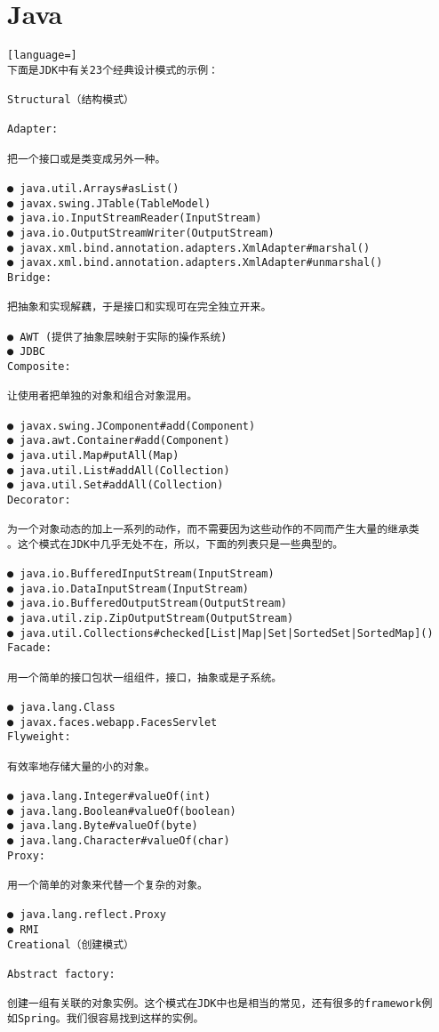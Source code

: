 \documentclass[a4paper,11pt]{book}
\begin{document}
\chapter{Java}

\begin{lstlisting}[language=]
下面是JDK中有关23个经典设计模式的示例：

Structural（结构模式）

Adapter:

把一个接口或是类变成另外一种。

● java.util.Arrays#asList()
● javax.swing.JTable(TableModel)
● java.io.InputStreamReader(InputStream)
● java.io.OutputStreamWriter(OutputStream)
● javax.xml.bind.annotation.adapters.XmlAdapter#marshal()
● javax.xml.bind.annotation.adapters.XmlAdapter#unmarshal()
Bridge:

把抽象和实现解藕，于是接口和实现可在完全独立开来。

● AWT (提供了抽象层映射于实际的操作系统)
● JDBC
Composite:

让使用者把单独的对象和组合对象混用。

● javax.swing.JComponent#add(Component)
● java.awt.Container#add(Component)
● java.util.Map#putAll(Map)
● java.util.List#addAll(Collection)
● java.util.Set#addAll(Collection)
Decorator:

为一个对象动态的加上一系列的动作，而不需要因为这些动作的不同而产生大量的继承类
。这个模式在JDK中几乎无处不在，所以，下面的列表只是一些典型的。

● java.io.BufferedInputStream(InputStream)
● java.io.DataInputStream(InputStream)
● java.io.BufferedOutputStream(OutputStream)
● java.util.zip.ZipOutputStream(OutputStream)
● java.util.Collections#checked[List|Map|Set|SortedSet|SortedMap]()
Facade:

用一个简单的接口包状一组组件，接口，抽象或是子系统。

● java.lang.Class
● javax.faces.webapp.FacesServlet
Flyweight:

有效率地存储大量的小的对象。

● java.lang.Integer#valueOf(int)
● java.lang.Boolean#valueOf(boolean)
● java.lang.Byte#valueOf(byte)
● java.lang.Character#valueOf(char)
Proxy:

用一个简单的对象来代替一个复杂的对象。

● java.lang.reflect.Proxy
● RMI
Creational（创建模式）

Abstract factory:

创建一组有关联的对象实例。这个模式在JDK中也是相当的常见，还有很多的framework例
如Spring。我们很容易找到这样的实例。


\end{lstlisting}
\end{document}
